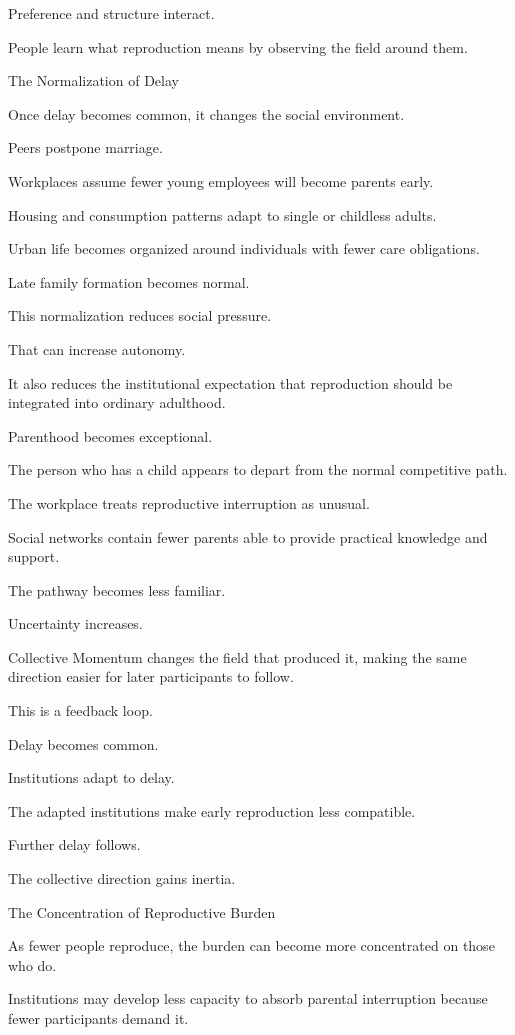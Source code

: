 Preference and structure interact.

People learn what reproduction means by observing the field around them.

The Normalization of Delay

Once delay becomes common, it changes the social environment.

Peers postpone marriage.

Workplaces assume fewer young employees will become parents early.

Housing and consumption patterns adapt to single or childless adults.

Urban life becomes organized around individuals with fewer care obligations.

Late family formation becomes normal.

This normalization reduces social pressure.

That can increase autonomy.

It also reduces the institutional expectation that reproduction should be integrated into ordinary adulthood.

Parenthood becomes exceptional.

The person who has a child appears to depart from the normal competitive path.

The workplace treats reproductive interruption as unusual.

Social networks contain fewer parents able to provide practical knowledge and support.

The pathway becomes less familiar.

Uncertainty increases.

Collective Momentum changes the field that produced it, making the same direction easier for later participants to follow.

This is a feedback loop.

Delay becomes common.

Institutions adapt to delay.

The adapted institutions make early reproduction less compatible.

Further delay follows.

The collective direction gains inertia.

The Concentration of Reproductive Burden

As fewer people reproduce, the burden can become more concentrated on those who do.

Institutions may develop less capacity to absorb parental interruption because fewer participants demand it.

